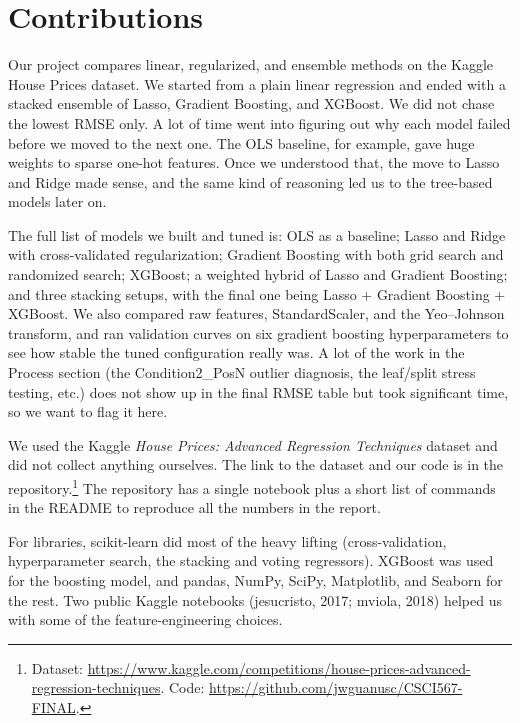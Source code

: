 \documentclass{article}
\begin{document}

\section{Contributions}

Our project compares linear, regularized, and ensemble methods on
the Kaggle House Prices dataset. We started from a plain linear
regression and ended with a stacked ensemble of Lasso, Gradient
Boosting, and XGBoost. We did not chase the lowest RMSE only.
A lot of time went into figuring out why each model failed before
we moved to the next one. The OLS baseline, for example, gave
huge weights to sparse one-hot features. Once we understood that,
the move to Lasso and Ridge made sense, and the same kind of
reasoning led us to the tree-based models later on.

The full list of models we built and tuned is: OLS as a baseline;
Lasso and Ridge with cross-validated regularization; Gradient
Boosting with both grid search and randomized search; XGBoost; a
weighted hybrid of Lasso and Gradient Boosting; and three stacking
setups, with the final one being Lasso + Gradient Boosting +
XGBoost. We also compared raw features, StandardScaler, and the
Yeo--Johnson transform, and ran validation curves on six gradient
boosting hyperparameters to see how stable the tuned configuration
really was. A lot of the work in the Process section
(the Condition2\_PosN outlier diagnosis, the leaf/split stress
testing, etc.) does not show up in the final RMSE table but took
significant time, so we want to flag it here.

We used the Kaggle \emph{House Prices: Advanced Regression
Techniques} dataset and did not collect anything ourselves. The
link to the dataset and our code is in the
repository.\footnote{Dataset: \url{https://www.kaggle.com/competitions/house-prices-advanced-regression-techniques}.
Code: \url{https://github.com/jwguanusc/CSCI567-FINAL}.} The
repository has a single notebook plus a short list of commands in
the README to reproduce all the numbers in the report.

For libraries, scikit-learn did most of the heavy lifting
(cross-validation, hyperparameter search, the stacking and voting
regressors). XGBoost was used for the boosting model, and pandas,
NumPy, SciPy, Matplotlib, and Seaborn for the rest. Two public
Kaggle notebooks (jesucristo, 2017; mviola, 2018) helped us with
some of the feature-engineering choices.
\end{document}
